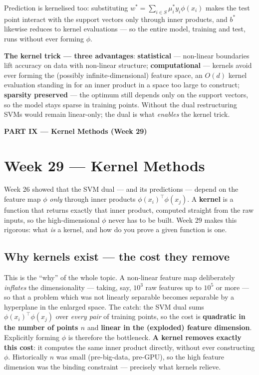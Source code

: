\documentclass[11pt, a4paper]{article}
\newcommand{\kw}[1]{\textbf{#1}}
\begin{document}
Prediction is kernelised too: substituting $w^\ast=\sum_{i\in S}\mu_i^\ast y_i\phi(x_i)$ makes the
test point interact with the support vectors only through inner products, and $b^\ast$ likewise
reduces to kernel evaluations — so the entire model, training and test, runs without ever forming
$\phi$.

\kw{The kernel trick — three advantages}: \kw{statistical} — non-linear boundaries lift accuracy on
data with non-linear structure; \kw{computational} — kernels avoid ever forming the (possibly
infinite-dimensional) feature space, an $O(d)$ kernel evaluation standing in for an inner product in
a space too large to construct; \kw{sparsity preserved} — the optimum still depends only on the
support vectors, so the model stays sparse in training points. Without the dual restructuring SVMs
would remain linear-only; the dual is what \emph{enables} the kernel trick.

\begin{center}\large\bfseries\color{defBd} PART IX — Kernel Methods (Week 29)\end{center}

\section{Week 29 — Kernel Methods}

\begin{setupbox}
Week 26 showed that the SVM dual — and its predictions — depend on the feature map $\phi$ \emph{only}
through inner products $\phi(x_i)^\top\phi(x_j)$. A \kw{kernel} is a function that returns exactly
that inner product, computed straight from the raw inputs, so the high-dimensional $\phi$ never has
to be built. Week 29 makes this rigorous: what \emph{is} a kernel, and how do you prove a given
function is one.
\end{setupbox}

\subsection{Why kernels exist — the cost they remove}

This is the ``why'' of the whole topic. A non-linear feature map deliberately \emph{inflates} the
dimensionality — taking, say, $10^3$ raw features up to $10^5$ or more — so that a problem which was
not linearly separable becomes separable by a hyperplane in the enlarged space. The catch: the SVM
dual sums $\phi(x_i)^\top\phi(x_j)$ over \emph{every pair} of training points, so the cost is
\kw{quadratic in the number of points $n$} and \kw{linear in the (exploded) feature dimension}.
Explicitly forming $\phi$ is therefore the bottleneck. \kw{A kernel removes exactly this cost}: it
computes the same inner product directly, without ever constructing $\phi$. Historically $n$ was
small (pre-big-data, pre-GPU), so the high feature dimension was the binding constraint — precisely
what kernels relieve.
\end{document}
